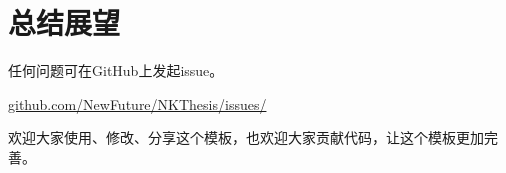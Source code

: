 \chapter{总结展望}

任何问题可在GitHub上发起issue。

\href{https://github.com/NewFuture/NKThesis/issues/}{github.com/NewFuture/NKThesis/issues/}


欢迎大家使用、修改、分享这个模板，也欢迎大家贡献代码，让这个模板更加完善。